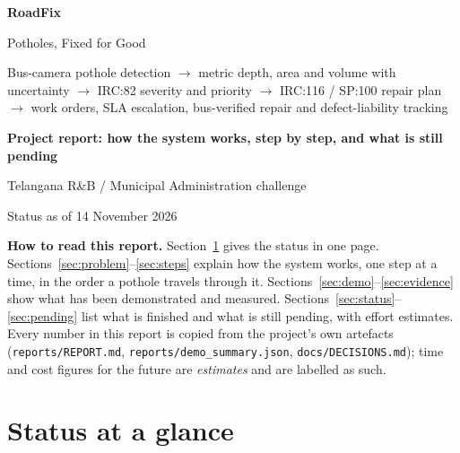\documentclass[11pt,a4paper]{article}
\newcommand{\code}[1]{\texttt{\small #1}}
\begin{document}
\begin{titlepage}
  \centering
  \vspace*{2.5cm}
  {\Huge\bfseries\color{gmblue} RoadFix\par}
  \vspace{4mm}
  {\Large Potholes, Fixed for Good\par}
  \vspace{10mm}
  {\large Bus-camera pothole detection $\rightarrow$ metric depth, area and volume with uncertainty
   $\rightarrow$ IRC:82 severity and priority $\rightarrow$ IRC:116 / SP:100 repair plan $\rightarrow$
   work orders, SLA escalation, bus-verified repair and defect-liability tracking\par}
  \vspace{14mm}
  {\Large\bfseries Project report: how the system works, step by step, and what is still pending\par}
  \vspace{12mm}
  {\large Telangana R\&B / Municipal Administration challenge\par}
  \vspace{4mm}
  {\large Status as of 14 November 2026\par}
  \vfill
  \begin{minipage}{0.86\textwidth}\small
  \textbf{How to read this report.} Section~\ref{sec:summary} gives the status in one page.
  Sections~\ref{sec:problem}--\ref{sec:steps} explain how the system works, one step at a time, in the order a
  pothole travels through it. Sections~\ref{sec:demo}--\ref{sec:evidence} show what has been demonstrated and
  measured. Sections~\ref{sec:status}--\ref{sec:pending} list what is finished and what is still pending, with
  effort estimates. Every number in this report is copied from the project's own artefacts
  (\code{reports/REPORT.md}, \code{reports/demo\_summary.json}, \code{docs/DECISIONS.md}); time and cost figures
  for the future are \emph{estimates} and are labelled as such.
  \end{minipage}
\end{titlepage}

\tableofcontents
\newpage

\section{Status at a glance}\label{sec:summary}
\end{document}
